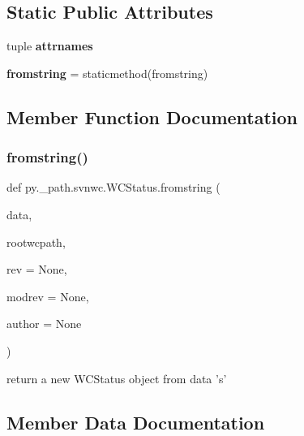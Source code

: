 \subsection*{Static Public Attributes}
\begin{DoxyCompactItemize}
\item 
tuple {\bfseries attrnames}
\item 
\mbox{\label{classpy_1_1__path_1_1svnwc_1_1_w_c_status_aeaa096c14ef6ecaf65ed22f3de164876}} 
{\bfseries fromstring} = staticmethod(fromstring)
\end{DoxyCompactItemize}


\subsection{Member Function Documentation}
\mbox{\label{classpy_1_1__path_1_1svnwc_1_1_w_c_status_a9a69f40c2d4544d0424565e9786723c9}} 
\subsubsection{\texorpdfstring{fromstring()}{fromstring()}}
{\footnotesize\ttfamily def py.\+\_\+path.\+svnwc.\+W\+C\+Status.\+fromstring (\begin{DoxyParamCaption}\item[{}]{data,  }\item[{}]{rootwcpath,  }\item[{}]{rev = {\ttfamily None},  }\item[{}]{modrev = {\ttfamily None},  }\item[{}]{author = {\ttfamily None} }\end{DoxyParamCaption})}

\begin{DoxyVerb}return a new WCStatus object from data 's'
\end{DoxyVerb}
 

\subsection{Member Data Documentation}
\mbox{\label{classpy_1_1__path_1_1svnwc_1_1_w_c_status_a8523aee40f487b278030e69728f2b70b}} 

